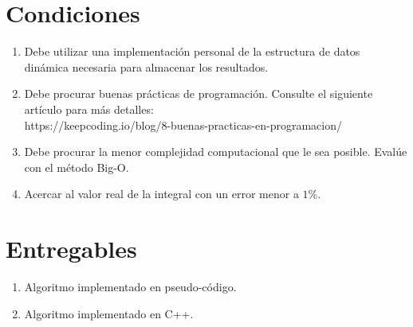\documentclass{article}
\begin{document}
\section*{Condiciones}
\begin{enumerate}
    \item Debe utilizar una implementación personal de la estructura de datos \\dinámica necesaria para almacenar los resultados.
    \item Debe procurar buenas prácticas de programación. Consulte el siguiente artículo para más detalles: \\ https://keepcoding.io/blog/8-buenas-practicas-en-programacion/
    \item Debe procurar la menor complejidad computacional que le sea posible. Evalúe con el método Big-O.
    \item Acercar al valor real de la integral con un error menor a $1\%$.
\end{enumerate}

\section*{Entregables}
\begin{enumerate}
    \item Algoritmo implementado en pseudo-código.
    \item Algoritmo implementado en C++.
\end{enumerate}
\end{document}
